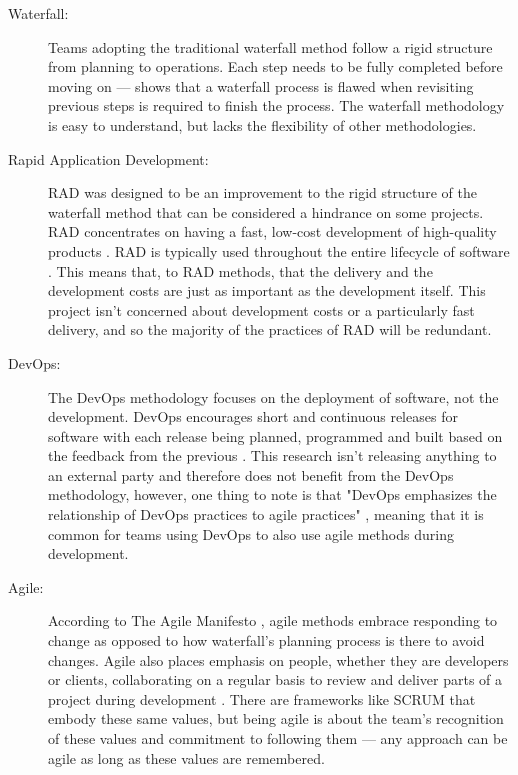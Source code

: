 \documentclass[11pt, a4paper]{report}
\begin{document}
\begin{description}

  \item[Waterfall:] Teams adopting the traditional waterfall method follow a rigid structure from planning to operations. Each step needs to be fully completed before moving on --- \citeauthor{royce1987managing} \parencite*[330]{royce1987managing} shows that a waterfall process is flawed when revisiting previous steps is required to finish the process. The waterfall methodology is easy to understand, but lacks the flexibility of other methodologies.
   
  \item[Rapid Application Development:] RAD was designed to be an improvement to the rigid structure of the waterfall method that can be considered a hindrance on some projects. RAD concentrates on having a fast, low-cost development of high-quality products \parencite{martin1991rapid}. RAD is typically used throughout the entire lifecycle of software \parencite[211]{beynon1999rapid}. This means that, to RAD methods, that the delivery and the development costs are just as important as the development itself. This project isn't concerned about development costs or a particularly fast delivery, and so the majority of the practices of RAD will be redundant.
   
  \item[DevOps:] The DevOps methodology focuses on the deployment of software, not the development. DevOps encourages short and continuous releases for software with each release being planned, programmed and built based on the feedback from the previous \parencite{bass2015devops}. This research isn't releasing anything to an external party and therefore does not benefit from the DevOps methodology, however, one thing to note is that "DevOps emphasizes the relationship of DevOps practices to agile practices" \parencite[15]{bass2015devops}, meaning that it is common for teams using DevOps to also use agile methods during development.

  \item[Agile:] According to The Agile Manifesto \parencite[2]{fowler2001agile}, agile methods embrace responding to change as opposed to how waterfall's planning process is there to avoid changes. Agile also places emphasis on people, whether they are developers or clients, collaborating on a regular basis to review and deliver parts of a project during development \parencite[3]{fowler2001agile}. There are frameworks like SCRUM \parencite[1]{fowler2001agile} that embody these same values, but being agile is about the team's recognition of these values and commitment to following them --- any approach can be agile as long as these values are remembered.

\end{description}
\end{document}
